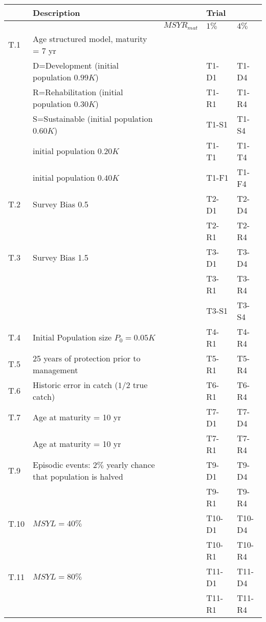 \begin{table}[ht]
\centering
\begin{tabular}{lllll}
  \hline
  & Description &              & Trial &        \\
  \hline
              & & $MSYR_{mat}$ & $1\%$ & $4\%$ \\
  \hline
  T.1   & Age structured model, maturity = 7 yr         & &       &         \\
        & D=Development (initial population $0.99K$)    & & T1-D1 & T1-D4 \\
        & R=Rehabilitation (initial population $0.30K$) & & T1-R1 & T1-R4 \\
        & S=Sustainable (initial population $0.60K$)    & & T1-S1 & T1-S4 \\
        & initial population $0.20K$                    & & T1-T1 & T1-T4 \\
        & initial population $0.40K$                    & & T1-F1 & T1-F4 \\
  T.2   & Survey Bias 0.5 & & T2-D1 & T2-D4 \\
        &                 & & T2-R1 & T2-R4 \\
  T.3   & Survey Bias 1.5 & & T3-D1 & T3-D4 \\
        &                 & & T3-R1 & T3-R4 \\
        &                 & & T3-S1 & T3-S4 \\
  T.4   & Initial Population size $P_0=0.05K$ & & T4-R1 & T4-R4 \\
  T.5   & 25 years of protection prior to management & & T5-R1 & T5-R4 \\
  T.6   & Historic error in catch ($1/2$ true catch) & & T6-R1 & T6-R4 \\
  T.7   & Age at maturity = 10 yr & & T7-D1 & T7-D4 \\
        & Age at maturity = 10 yr & & T7-R1 & T7-R4 \\
  T.9   & Episodic events: $2\%$ yearly chance that population is halved & & T9-D1 & T9-D4 \\
        &                                                                & & T9-R1 & T9-R4 \\
  T.10  & $MSYL=40\%$ & & T10-D1 & T10-D4 \\
        &             & & T10-R1 & T10-R4 \\
  T.11  & $MSYL=80\%$ & & T11-D1 & T11-D4 \\
        &             & & T11-R1 & T11-R4 \\

\end{tabular}
\end{table}
